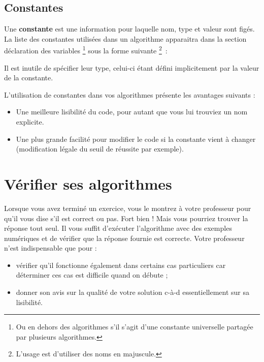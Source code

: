		\subsection{Constantes}
	
			Une \textbf{constante} est une information pour laquelle nom, type et
			valeur sont figés. La liste des constantes utilisées dans un algorithme
			apparaitra dans la section déclaration des variables%
			\footnote{%
				Ou en dehors des algorithmes s'il s'agit d'une
				constante universelle partagée par plusieurs algorithmes.%
			} 
			sous la forme suivante%
			\footnote{%
				L'usage est d'utiliser des noms en majuscule.%
			}~:
	
			\begin{LDA}
			\end{LDA}
	
			Il est inutile de spécifier leur type, celui-ci
			étant défini implicitement par la valeur de la constante.
	
			L'utilisation de constantes dans vos algorithmes présente
			les avantages suivants :
			\begin{itemize}
			\item
				Une meilleure lisibilité du code,
				pour autant que vous lui trouviez un nom explicite.
			\item
				Une plus grande facilité pour modifier le code
				si la constante vient à changer 
				(modification légale du seuil de réussite par exemple).
			\end{itemize}
			
	\section{Vérifier ses algorithmes}
	
		Lorsque vous avez terminé un exercice,
		vous le montrez à votre professeur pour qu'il
		vous dise s'il est correct ou pas.
		Fort bien !
		Mais vous pourriez trouver la réponse tout seul.
		Il vous suffit d'exécuter l'algorithme
		avec des exemples numériques et de vérifier que la réponse
		fournie est correcte.
		Votre professeur n'est indispensable que pour :
		\begin{itemize}
		\item
			vérifier qu'il fonctionne également
			dans certains cas particuliers
			car déterminer ces cas est difficile quand on débute ;
		\item
			donner son avis sur la qualité de votre solution
			c-à-d essentiellement sur sa lisibilité.
		\end{itemize}
	
